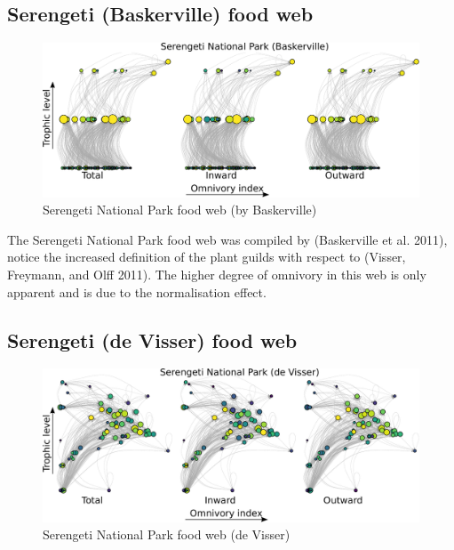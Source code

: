 \documentclass[11pt,article,oneside]{memoir}
\makeatletter
\def\maxwidth{\ifdim\Gin@nat@width>\linewidth\linewidth
\else\Gin@nat@width\fi}
\let\Oldincludegraphics\includegraphics
\renewcommand{\includegraphics}[1]{\Oldincludegraphics[width=\maxwidth]{#1}}
\makeatother
\begin{document}
\newpage

\subsection{Serengeti (Baskerville) food
web}\label{serengeti-baskerville-food-web}

\begin{figure}[htbp]
\centering
\includegraphics{Images/Webs/Serengeti_Baskerville.pdf}
\caption{Serengeti National Park food web (by Baskerville)}
\end{figure}

The Serengeti National Park food web was compiled by (Baskerville et al.
2011), notice the increased definition of the plant guilds with respect
to (Visser, Freymann, and Olff 2011). The higher degree of omnivory in
this web is only apparent and is due to the normalisation effect.

\newpage

\subsection{Serengeti (de Visser) food
web}\label{serengeti-de-visser-food-web}

\begin{figure}[htbp]
\centering
\includegraphics{Images/Webs/Serengeti_deVisser.pdf}
\caption{Serengeti National Park food web (de Visser)}
\end{figure}
\end{document}
